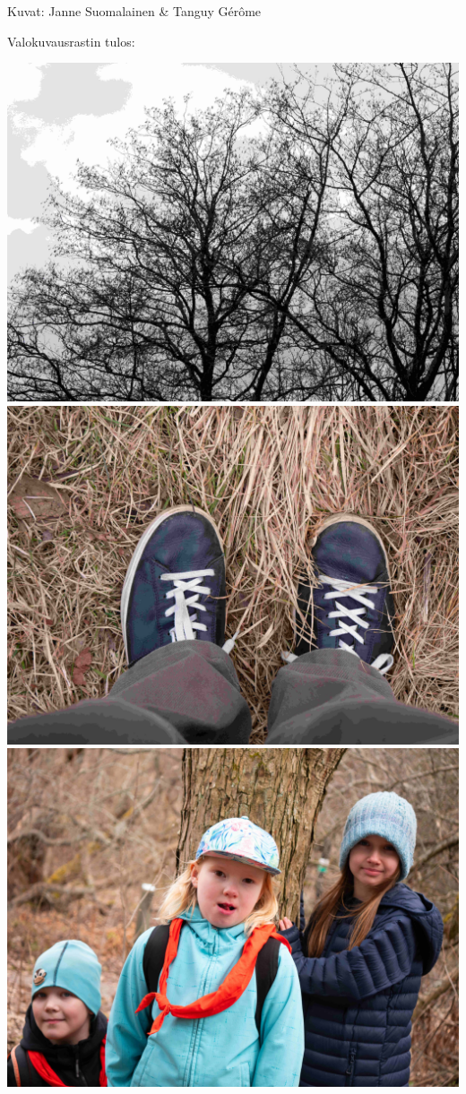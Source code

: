 \documentclass[10pt,finnish,a5paper,headings=small,twoside=semi]{scrartcl}
\begin{document}
\medskip
\noindent\null\hfill Kuvat: Janne Suomalainen \& Tanguy Gérôme
\vspace*{-0.64cm}

\clearpage

Valokuvausrastin tulos:

\begin{multicols}{2}

	\centering
	\noindent\includegraphics[width=0.9\linewidth]{assets/kolkkienpäiväretki4}
	\noindent\includegraphics[width=0.9\linewidth]{assets/kolkkienpäiväretki5}
	\noindent\includegraphics[width=0.9\linewidth]{assets/kolkkienpäiväretki6}

\end{multicols}
\end{document}
